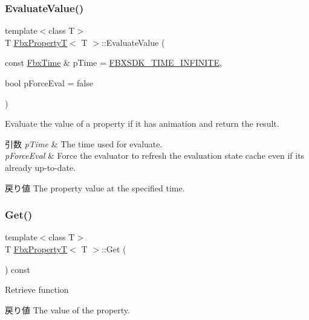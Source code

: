 \subsubsection{\texorpdfstring{Evaluate\+Value()}{EvaluateValue()}}
{\footnotesize\ttfamily template$<$class T$>$ \\
T \hyperlink{class_fbx_property_t}{Fbx\+PropertyT}$<$ T $>$\+::Evaluate\+Value (\begin{DoxyParamCaption}\item[{const \hyperlink{class_fbx_time}{Fbx\+Time} \&}]{p\+Time = {\ttfamily \hyperlink{fbxtime_8h_a1e6db3fe0f84f0b7daa775739f93526f}{F\+B\+X\+S\+D\+K\+\_\+\+T\+I\+M\+E\+\_\+\+I\+N\+F\+I\+N\+I\+TE}},  }\item[{bool}]{p\+Force\+Eval = {\ttfamily false} }\end{DoxyParamCaption})}

Evaluate the value of a property if it has animation and return the result. 
\begin{DoxyParams}{引数}
{\em p\+Time} & The time used for evaluate. \\
\hline
{\em p\+Force\+Eval} & Force the evaluator to refresh the evaluation state cache even if its already up-\/to-\/date. \\
\hline
\end{DoxyParams}
\begin{DoxyReturn}{戻り値}
The property value at the specified time. 
\end{DoxyReturn}
\mbox{\label{class_fbx_property_t_aed683fb109a3a7b1fa4eacd648ae2478}} 
\subsubsection{\texorpdfstring{Get()}{Get()}}
{\footnotesize\ttfamily template$<$class T$>$ \\
T \hyperlink{class_fbx_property_t}{Fbx\+PropertyT}$<$ T $>$\+::Get (\begin{DoxyParamCaption}{ }\end{DoxyParamCaption}) const}

Retrieve function \begin{DoxyReturn}{戻り値}
The value of the property. 
\end{DoxyReturn}
\mbox{\label{class_fbx_property_t_aa4794cefd88b587963f0021c1ec32835}} 
